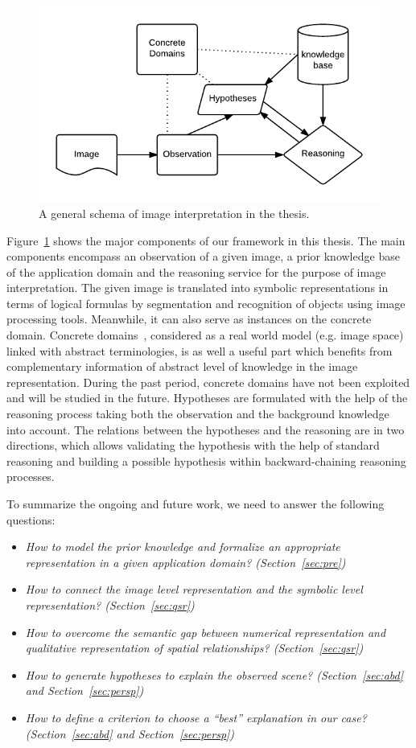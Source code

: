 \documentclass{article}
\begin{document}
\begin{figure}[h]
  \centering
   \includegraphics[scale=.8]{./figures/schemageneral.pdf}
   \caption{\label{fig:intro_schema} A general schema of image interpretation in the thesis.}
 \end{figure} 
Figure~\ref{fig:intro_schema} shows the major components of our framework in this thesis. 
The main components encompass an observation of a given image, a prior knowledge base of the application domain and the reasoning service for the purpose of image interpretation. 
The given image is translated into symbolic representations in terms of logical formulas by segmentation and recognition of objects using image processing tools.
Meanwhile, it can also serve as instances on the concrete domain.
Concrete domains~\cite{carsten2005keys}, considered as a real world model (e.g. image space) linked with abstract terminologies, 
is as well a useful part which benefits from complementary information of abstract level of knowledge in the image representation.
During the past period, concrete domains have not been exploited and will be studied in the future.
Hypotheses are formulated with the help of the reasoning process taking both the observation and the background knowledge into account.
The relations between the hypotheses and the reasoning are in two directions, which allows validating the hypothesis with the help of standard reasoning and
building a possible hypothesis within backward-chaining reasoning processes.

To summarize the ongoing and future work, we need to answer the following questions:
\begin{itemize}
 \item \textit{How to model the prior knowledge and formalize an appropriate representation in a given application domain? (Section~\ref{sec:pre})}
 \item \textit{How to connect the image level representation and the symbolic level representation? (Section~\ref{sec:qsr})}
 \item \textit{How to overcome the semantic gap between numerical representation and qualitative representation of spatial relationships? (Section~\ref{sec:qsr})}
 \item \textit{How to generate hypotheses to explain the observed scene? (Section~\ref{sec:abd} and Section~\ref{sec:persp})}
 \item \textit{How to define a criterion to choose a ``best'' explanation in our case? (Section~\ref{sec:abd} and Section~\ref{sec:persp})}
\end{itemize}
\end{document}
